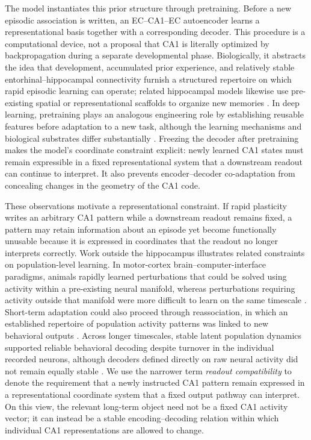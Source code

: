 The model instantiates this prior structure through pretraining.
Before a new episodic association is written, an EC--CA1--EC autoencoder learns a representational basis together with a corresponding decoder.
This procedure is a computational device, not a proposal that CA1 is literally optimized by backpropagation during a separate developmental phase.
Biologically, it abstracts the idea that development, accumulated prior experience, and relatively stable entorhinal--hippocampal connectivity furnish a structured repertoire on which rapid episodic learning can operate; related hippocampal models likewise use pre-existing spatial or representational scaffolds to organize new memories \citep{mcclelland1995,chandra2025,wen2024}.
In deep learning, pretraining plays an analogous engineering role by establishing reusable features before adaptation to a new task, although the learning mechanisms and biological substrates differ substantially \citep{yosinski2014}.
Freezing the decoder after pretraining makes the model's coordinate constraint explicit: newly learned CA1 states must remain expressible in a fixed representational system that a downstream readout can continue to interpret.
It also prevents encoder--decoder co-adaptation from concealing changes in the geometry of the CA1 code.

%
These observations motivate a representational constraint.
If rapid plasticity writes an arbitrary CA1 pattern while a downstream readout remains fixed, a pattern may retain information about an episode yet become functionally unusable because it is expressed in coordinates that the readout no longer interprets correctly.
Work outside the hippocampus illustrates related constraints on population-level learning.
In motor-cortex brain--computer-interface paradigms, animals rapidly learned perturbations that could be solved using activity within a pre-existing neural manifold, whereas perturbations requiring activity outside that manifold were more difficult to learn on the same timescale \citep{sadtler2014}.
Short-term adaptation could also proceed through reassociation, in which an established repertoire of population activity patterns was linked to new behavioral outputs \citep{golub2018}.
Across longer timescales, stable latent population dynamics supported reliable behavioral decoding despite turnover in the individual recorded neurons, although decoders defined directly on raw neural activity did not remain equally stable \citep{gallego2020}.
We use the narrower term \emph{readout compatibility} to denote the requirement that a newly instructed CA1 pattern remain expressed in a representational coordinate system that a fixed output pathway can interpret.
On this view, the relevant long-term object need not be a fixed CA1 activity vector; it can instead be a stable encoding--decoding relation within which individual CA1 representations are allowed to change.

